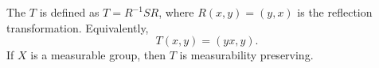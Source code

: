 The  $T$ is defined as $T = R^{-1}SR$, where $R(x,y) = (y,x)$ is the reflection transformation. Equivalently,
$$T(x,y) = (yx,y).$$
If $X$ is a measurable group, then $T$ is measurability preserving.
